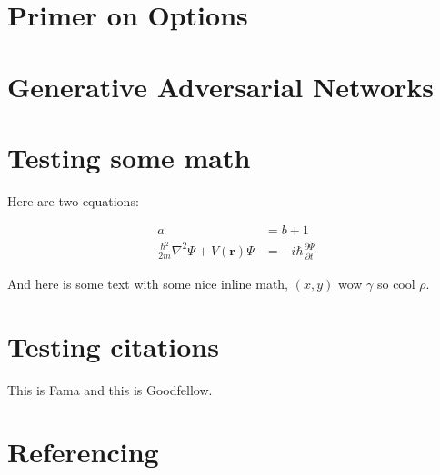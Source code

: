 \section{Primer on Options}

\section{Generative Adversarial Networks}

\section{Testing some math}
Here are two equations:

\begin{align}
a &= b + 1 \\
\frac{\hbar^2}{2m}\nabla^2\Psi + V(\mathbf{r})\Psi
&= -i\hbar \frac{\partial\Psi}{\partial t}    
\end{align}


And here is some text with some nice inline math, $(x, y)$ wow $\gamma$ so cool $\rho$.


\section{Testing citations}
This is Fama\cite{fama_efficient_market} and this is Goodfellow\cite{gan_original}.


\section{Referencing}
